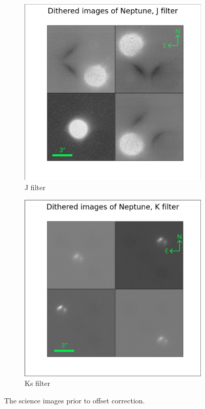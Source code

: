\documentclass{article}
\begin{document}
\begin{figure}
\begin{subfigure}[b]{0.3\textwidth}
            \includegraphics[width=\textwidth]{uncorr_J_sc.png}
            \caption[uncorr J]%
            {{\small J filter}}    
            \label{fig:uncorr_J}
        \end{subfigure}
        \hfill
        \begin{subfigure}[b]{0.3\textwidth}
            \centering
            \includegraphics[width=\textwidth]{uncorr_K_sc.png}
            \caption[uncorr Ks]%
            {{\small Ks filter}}    
            \label{fig:uncorr_Ks}
        \end{subfigure}
        \caption{The science images prior to offset correction.}
        \label{fig:uncorr_images}
    \end{figure}
\end{document}
